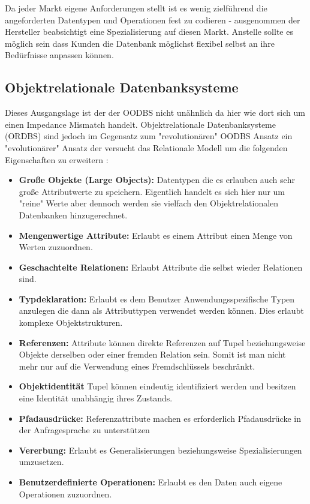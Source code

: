 Da jeder Markt eigene Anforderungen stellt ist es wenig zielführend die angeforderten Datentypen und Operationen fest zu codieren - ausgenommen der Hersteller beabsichtigt eine Spezialisierung auf diesen Markt. Anstelle sollte es möglich sein dass Kunden die Datenbank möglichst flexibel selbst an ihre Bedürfnisse anpassen können.


\subsection{Objektrelationale Datenbanksysteme}
Dieses Ausgangslage ist der der OODBS nicht unähnlich da hier wie dort sich um einen Impedance Mismatch handelt. Objektrelationale Datenbanksysteme (ORDBS) sind jedoch im Gegensatz zum "{}revolutionären"{} OODBS Ansatz ein "{}evolutionärer"{} Ansatz der versucht das Relationale Modell um die folgenden Eigenschaften zu erweitern \cite{kemper2013}:
\begin{itemize}
	\item \textbf{Große Objekte (Large Objects):} Datentypen die es erlauben auch sehr große Attributwerte zu speichern. Eigentlich handelt es sich hier nur um "{}reine"{} Werte aber dennoch werden sie vielfach den Objektrelationalen Datenbanken hinzugerechnet.
	\item \textbf{Mengenwertige Attribute:} Erlaubt es einem Attribut einen Menge von Werten zuzuordnen.
	\item \textbf{Geschachtelte Relationen:} Erlaubt Attribute die selbst wieder Relationen sind.
	\item \textbf{Typdeklaration:} Erlaubt es dem Benutzer Anwendungsspezifische Typen anzulegen die dann als Attributtypen verwendet werden können. Dies erlaubt komplexe Objektstrukturen.
	\item \textbf{Referenzen:} Attribute können direkte Referenzen auf Tupel beziehungsweise Objekte derselben oder einer fremden Relation sein. Somit ist man nicht mehr nur auf die Verwendung eines Fremdschlüssels beschränkt.
	\item \textbf{Objektidentität} Tupel können eindeutig identifiziert werden und besitzen eine Identität unabhängig ihres Zustands. 
	\item \textbf{Pfadausdrücke:} Referenzattribute machen es erforderlich Pfadausdrücke in der Anfragesprache zu unterstützen
	\item \textbf{Vererbung:} Erlaubt es Generalisierungen beziehungsweise Spezialisierungen umzusetzen.
	\item \textbf{Benutzerdefinierte Operationen:} Erlaubt es den Daten auch eigene Operationen zuzuordnen.
\end{itemize}

